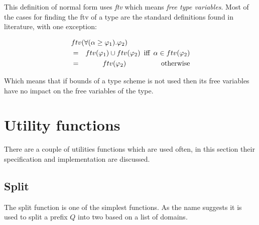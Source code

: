 This definition of normal form uses \emph{ftv} which means \emph{free type variables}. Most of the cases for finding the ftv of a type are the standard definitions found in literature, with one exception:

\begin{eqnarray*}
\lefteqn{ftv(\forall(\alpha \geq \varphi_1).\varphi_2) }\\
  & = & ftv(\varphi_1)\cup ftv(\varphi_2) \hspace{5pt} \textrm{iff} \hspace{5pt} \alpha \in ftv(\varphi_2) \\
  & = & ftv(\varphi_2) \hspace{50pt} \textrm{otherwise}
\end{eqnarray*}

Which means that if bounds of a type scheme is not used then its free variables have no impact on the free variables of the type.
\section{Utility functions}
There are a couple of utilities functions which are used often, in this section their specification and implementation are discussed.
\subsection{Split}
The split function is one of the simplest functions. As the name suggests it is used to split a prefix $Q$ into two based on a list of domains.

